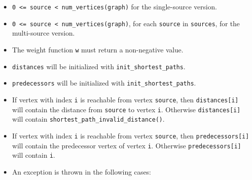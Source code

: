 \begin{itemdescr}
      \pnum\mandates
            \begin{itemize}
                  \item
                        \lstinline{0 <= source < num_vertices(graph)} for the single-source version.
                  \item
                        \lstinline{0 <= source < num_vertices(graph)}, for each \lstinline{source} in \lstinline{sources}, 
                                   for the multi-source version.
                  \item
                        The weight function \lstinline{w} must return a non-negative value.
            \end{itemize}
      \pnum\preconditions
            \begin{itemize}
                  \item
                        \lstinline{distances} will be initialized with \lstinline{init_shortest_paths}.
                  \item
                        \lstinline{predecessors} will be initialized with \lstinline{init_shortest_paths}.
            \end{itemize}
      \pnum\effects
            \begin{itemize}
                  \item
                        If vertex with index \lstinline{i} is reachable from vertex \lstinline{source}, then
                        \lstinline{distances[i]} will contain the distance from \lstinline{source} to vertex
                        \lstinline{i}.  Otherwise \lstinline{distances[i]} will contain
                        \lstinline{shortest_path_invalid_distance()}.
                  \item
                        If vertex with index \lstinline{i} is reachable
                        from vertex \lstinline{source}, then \lstinline{predecessors[i]} will contain the
                        predecessor vertex of vertex \lstinline{i}. Otherwise \lstinline{predecessors[i]} will contain
                        \lstinline{i}.
            \end{itemize}
      \pnum\throws 
            \begin{itemize}
                  \item An  exception is thrown in the following cases:

\end{itemize}
\end{itemdescr}
